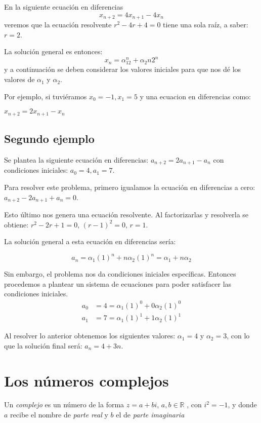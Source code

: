 \documentclass{report}
\begin{document}
En la siguiente ecuación en diferencias
\begin{equation}
  \label{eq:1}
  x_{n+2}=4x_{n+1}-4x_{n}
\end{equation}
veremos que la ecuación resolvente $r^2-4r+4=0$ tiene una sola raíz, a
saber: $r=2$.

La solución general es entonces:
$$x_n=\alpha_12^n+\alpha_2n2^n$$
y a continuación se deben considerar los valores iniciales para que
nos dé los valores de $\alpha_1$ y $\alpha_2$.

Por ejemplo, si tuviéramos $x_0=-1,x_1=5$ y una ecuacion en diferencias como:

$x_{n+2}=2x_{n+1}-x_n$

\subsection{Segundo ejemplo}

Se plantea la siguiente ecuación en diferencias:
$a_{n+2}=2a_{n+1}-a_{n}$ con condiciones iniciales: $a_{0}=4, a_{1}=7$.

Para resolver este problema, primero igualamos la ecuación en diferencias a
cero: $a_{n+2}-2a_{n+1}+a_{n}=0$.

Esto último nos genera una ecuación resolvente. Al factorizarlas y
resolverla se obtiene: $r^2-2r+1=0$, $(r-1)^2=0$, ${r=1}$.

La solución general a esta ecuación en diferencias sería:



$$a_{n}=\alpha_{1}(1)^n+n\alpha_{2}(1)^n=\alpha_{1}+n\alpha_{2}$$

Sin embargo, el problema nos da condiciones iniciales
específicas. Entonces procedemos a plantear un sistema de ecuaciones
para poder satisfacer las condiciones iniciales.
\begin{align*}
  a_{0}&=4=\alpha_{1}(1)^0+0\alpha_{2}(1)^0\\
  a_{1}&=7=\alpha_{1}(1)^1+1\alpha_{2}(1)^1
\end{align*}

Al resolver lo anterior obtenemos los siguientes valores:
$\alpha_{1}=4$ y $\alpha_{2}=3$, con lo que la solución final será:
$a_{n}=4+3n$.


\section{Los números  complejos}

Un \textit{complejo} es un número de la forma $z=a+bi$, $a,b\in\mathbb{R}$ ,
con $i^2=-1$, y donde $a$ recibe el nombre de \textit{parte real} y $b$ el de
\textit{parte imaginaria}
\end{document}
